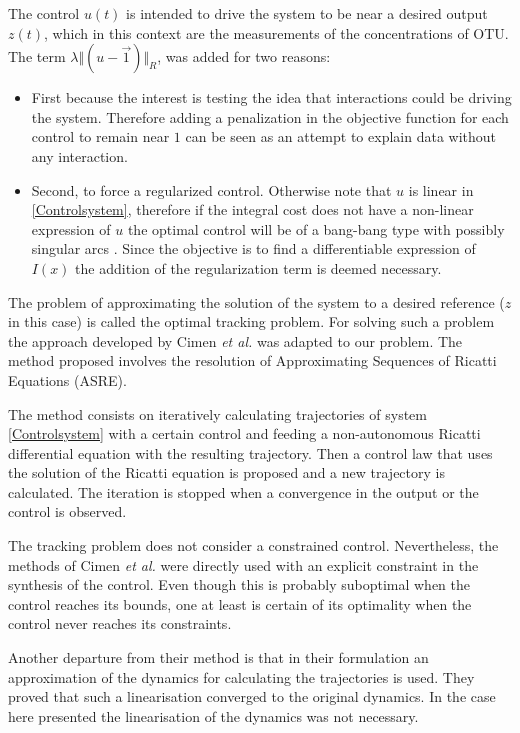 \documentclass[3p,times]{elsarticle}
\begin{document}
The control $u(t)$ is intended to drive the system to be near a desired output $z(t)$, which in this context are the measurements of the concentrations of OTU. The term $\lambda \Vert(u -\vec{1}) \Vert_R$, was added for two reasons:
\begin{itemize}
\item First because the interest is testing the idea that interactions could be driving the system. Therefore adding a penalization in the objective function for each control to remain near $1$ can be seen as an attempt to explain data without any interaction.
\item Second, to force a regularized control. Otherwise note that $u$ is linear in \eqref{Controlsystem}, therefore if the integral cost does not have a non-linear expression of $u$ the optimal control will be of a bang-bang type with possibly singular arcs \cite{harmand2019optimal}. Since the objective is to find a differentiable expression of $I(x)$ the addition of the regularization term is deemed necessary.
\end{itemize} 
The problem of approximating the solution of the system to a desired reference ($z$ in this case) is called the optimal tracking problem. For solving such a problem the approach developed by Cimen \textit{et al.} \cite{Cimen2004, Cimen2008} was adapted to our problem. The method proposed involves the resolution of Approximating Sequences of Ricatti Equations (ASRE). 

The method consists on iteratively calculating trajectories of system \eqref{Controlsystem} with a certain control and feeding a non-autonomous Ricatti differential equation with the resulting trajectory. Then a control law that uses the solution of the Ricatti equation is proposed and a new trajectory is calculated. The iteration is stopped when a convergence in the output or  the control is observed.

The tracking problem does not consider a constrained control. Nevertheless, the methods of Cimen \textit{et al.}\cite{Cimen2004} were directly used with an explicit constraint in the synthesis of the control. Even though this is probably suboptimal when the control reaches its bounds, one at least is certain of its optimality when the control never reaches its constraints.

Another departure from their method is that in their formulation an approximation of the dynamics for calculating the trajectories is used. They proved that such a linearisation converged to the original dynamics. In the case here presented the linearisation of the dynamics was not necessary.
\end{document}
